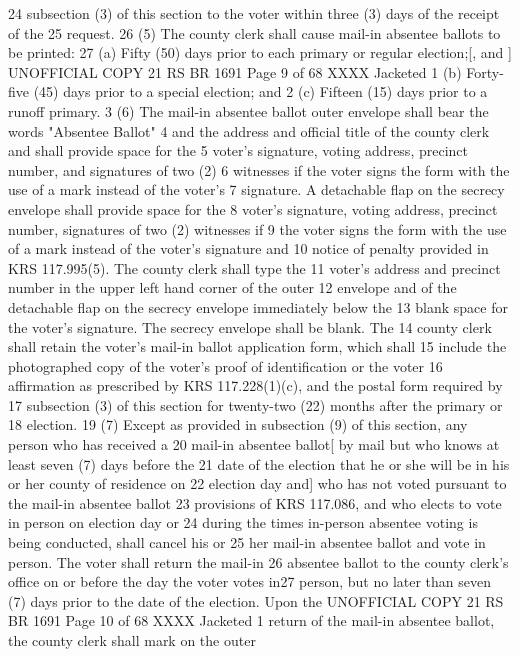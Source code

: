 24 subsection (3) of this section to the voter within three (3) days of the receipt of the
25 request.
26 (5) The county clerk shall cause mail-in absentee ballots to be printed:
27 (a) Fifty (50) days prior to each primary or regular election;[, and ]
UNOFFICIAL COPY 21 RS BR 1691
Page 9 of 68
XXXX Jacketed
1 (b) Forty-five (45) days prior to a special election; and
2 (c) Fifteen (15) days prior to a runoff primary.
3 (6) The mail-in absentee ballot outer envelope shall bear the words "Absentee Ballot"
4 and the address and official title of the county clerk and shall provide space for the
5 voter's signature, voting address, precinct number, and signatures of two (2)
6 witnesses if the voter signs the form with the use of a mark instead of the voter's
7 signature. A detachable flap on the secrecy envelope shall provide space for the
8 voter's signature, voting address, precinct number, signatures of two (2) witnesses if
9 the voter signs the form with the use of a mark instead of the voter's signature and
10 notice of penalty provided in KRS 117.995(5). The county clerk shall type the
11 voter's address and precinct number in the upper left hand corner of the outer
12 envelope and of the detachable flap on the secrecy envelope immediately below the
13 blank space for the voter's signature. The secrecy envelope shall be blank. The
14 county clerk shall retain the voter's mail-in ballot application form, which shall
15 include the photographed copy of the voter's proof of identification or the voter
16 affirmation as prescribed by KRS 117.228(1)(c), and the postal form required by
17 subsection (3) of this section for twenty-two (22) months after the primary or
18 election.
19 (7) Except as provided in subsection (9) of this section, any person who has received a
20 mail-in absentee ballot[ by mail but who knows at least seven (7) days before the
21 date of the election that he or she will be in his or her county of residence on
22 election day and] who has not voted pursuant to the mail-in absentee ballot
23 provisions of KRS 117.086, and who elects to vote in person on election day or
24 during the times in-person absentee voting is being conducted, shall cancel his or
25 her mail-in absentee ballot and vote in person. The voter shall return the mail-in
26 absentee ballot to the county clerk's office on or before the day the voter votes in27 person, but no later than seven (7) days prior to the date of the election. Upon the 
UNOFFICIAL COPY 21 RS BR 1691
Page 10 of 68
XXXX Jacketed
1 return of the mail-in absentee ballot, the county clerk shall mark on the outer
